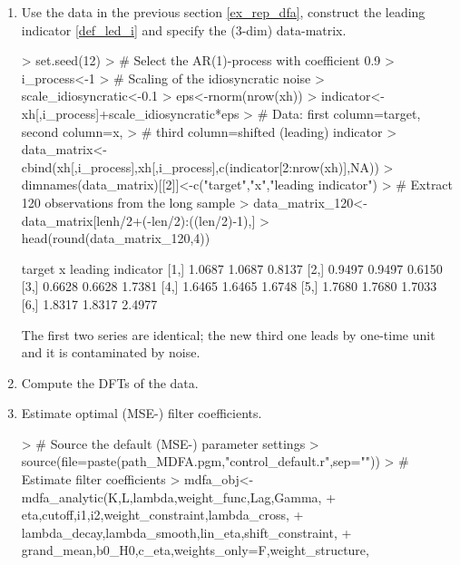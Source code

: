 \documentclass[a4paper]{book}
\begin{document}
\begin{enumerate}
\item Use the data in the previous section \ref{ex_rep_dfa}, construct the leading indicator \ref{def_led_i} and specify the (3-dim) data-matrix.
\begin{Schunk}
\begin{Sinput}
> set.seed(12)
> # Select the AR(1)-process with coefficient 0.9
> i_process<-1
> # Scaling of the idiosyncratic noise
> scale_idiosyncratic<-0.1
> eps<-rnorm(nrow(xh))
> indicator<-xh[,i_process]+scale_idiosyncratic*eps
> # Data: first column=target, second column=x, 
> #   third column=shifted (leading) indicator
> data_matrix<-cbind(xh[,i_process],xh[,i_process],c(indicator[2:nrow(xh)],NA))
> dimnames(data_matrix)[[2]]<-c("target","x","leading indicator")
> # Extract 120 observations from the long sample
> data_matrix_120<-data_matrix[lenh/2+(-len/2):((len/2)-1),]
> head(round(data_matrix_120,4))
\end{Sinput}
\begin{Soutput}
     target      x leading indicator
[1,] 1.0687 1.0687            0.8137
[2,] 0.9497 0.9497            0.6150
[3,] 0.6628 0.6628            1.7381
[4,] 1.6465 1.6465            1.6748
[5,] 1.7680 1.7680            1.7033
[6,] 1.8317 1.8317            2.4977
\end{Soutput}
\end{Schunk}
The first two series are identical; the new third one leads by one-time unit and it is contaminated by noise.
\item Compute the DFTs of the data.
\begin{Schunk}
\end{Schunk}
\item Estimate optimal (MSE-) filter coefficients.
\begin{Schunk}
\begin{Sinput}
> # Source the default (MSE-) parameter settings
> source(file=paste(path_MDFA.pgm,"control_default.r",sep=""))
> # Estimate filter coefficients
> mdfa_obj<-mdfa_analytic(K,L,lambda,weight_func,Lag,Gamma,
+                     eta,cutoff,i1,i2,weight_constraint,lambda_cross,
+                     lambda_decay,lambda_smooth,lin_eta,shift_constraint,
+                     grand_mean,b0_H0,c_eta,weights_only=F,weight_structure,

\end{Sinput}
\end{Schunk}
\end{enumerate}
\end{document}
